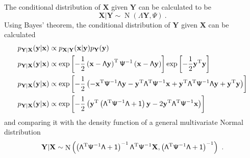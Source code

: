 \documentclass[12pt]{report}
\DeclareMathOperator{\normal}{N}
\newcommand{\T}{^\textup{T}}
\newcommand{\vect}[1]{\mathbf{#1}}
\newcommand{\matr}[1]{\mathsf{#1}}
\begin{document}
The conditional distribution of $\vect{X}$ given $\vect{Y}$ can be calculated to be
\begin{equation}
\vect{X}|\vect{Y}\sim\normal\left(\matr{\Lambda}\vect{Y},\matr{\Psi}\right) \ .
\label{eq:factor_analysis_x_given_y_dist}
\end{equation}
Using Bayes' theorem, the conditional distribution of $\vect{Y}$ given $\vect{X}$ can be calculated
\begin{align*}
p_{\vect{Y}|\vect{X}}(\vect{y}|\vect{x}) &\propto p_{\vect{X}|\vect{Y}}(\vect{x}|\vect{y}) p_{\vect{Y}}(\vect{y})
\\
p_{\vect{Y}|\vect{X}}(\vect{y}|\vect{x}) &\propto \exp\left[-\frac{1}{2}\left(\vect{x}-\matr{\Lambda}\vect{y}\right)\T\matr{\Psi}^{-1}\left(\vect{x}-\matr{\Lambda}\vect{y}\right)\right]
\exp\left[-\frac{1}{2}\vect{y}\T\vect{y}\right]
\\
p_{\vect{Y}|\vect{X}}(\vect{y}|\vect{x}) &\propto \exp \left[-\frac{1}{2}\left(-\vect{x}\T\matr{\Psi}^{-1}\matr{\Lambda}\vect{y}-\vect{y}\T\matr{\Lambda}\T\matr{\Psi}^{-1}\vect{x}+\vect{y}\T\matr{\Lambda}\T\matr{\Psi}^{-1}\matr{\Lambda}\vect{y}+\vect{y}\T\vect{y}\right)\right]
\\
p_{\vect{Y}|\vect{X}}(\vect{y}|\vect{x}) &\propto \exp \left[-\frac{1}{2}\left(\vect{y}\T\left(\matr{\Lambda}\T\matr{\Psi}^{-1}\matr{\Lambda}+\matr{1}\right)\vect{y}-2\vect{y}\T\matr{\Lambda}\T\matr{\Psi}^{-1}\vect{x}\right)\right]
\end{align*}
and comparing it with the density function of a general multivariate Normal distribution
\begin{equation}
\vect{Y}|\vect{X}\sim\normal\left(\left(\matr{\Lambda}\T\matr{\Psi}^{-1}\matr{\Lambda}+\matr{1}\right)^{-1}\matr{\Lambda}\T\matr{\Psi}^{-1}\vect{X},\left(\matr{\Lambda}\T\matr{\Psi}^{-1}\matr{\Lambda}+\matr{1}\right)^{-1}\right) \ .
\label{eq:factor_analysis_y_given_x_dist}
\end{equation}
\end{document}
